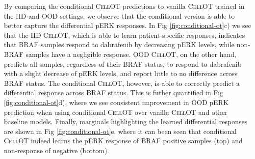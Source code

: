 By comparing the conditional \textsc{CellOT} predictions to vanilla \textsc{CellOT} trained in the IID and OOD settings, we observe that the conditional version is able to better capture the differential pERK responses.
In Fig \ref{fig:conditional-ot}c) we see that the IID \textsc{CellOT}, which is able to learn patient-specific responses, indicates that BRAF samples respond to dabrafenib by decreasing pERK levels, while non-BRAF samples have a negligible response.
OOD \textsc{CellOT}, on the other hand, predicts all samples, regardless of their BRAF status, to respond to dabrafenib with a slight decrease of pERK levels, and report little to no difference across BRAF status.
The conditional \textsc{CellOT}, however, is able to correctly predict a differential response across BRAF status.
This is futher quantified in Fig \ref{fig:conditional-ot}d), where we see consistent improvement in OOD pERK prediction when using conditional \textsc{CellOT} over vanilla \textsc{CellOT} and other baseline models.
Finally, marginals highlighting the learned differential responses are shown in Fig \ref{fig:conditional-ot}e,
where it can been seen that conditional \textsc{CellOT} indeed learns the pERK response of BRAF positive samples (top) and non-response of negative (bottom).
